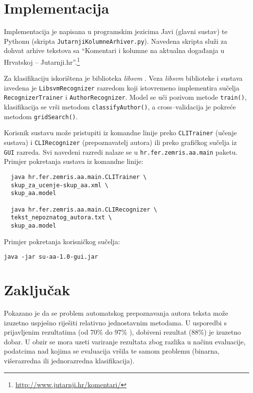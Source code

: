 \documentclass{article}
\begin{document}
\section{Implementacija}
\label{sec:implementacija}
Implementacija je napisana u programskim jezicima Javi (glavni sustav) te
Pythonu (skripta \texttt{JutarnjiKolumneArhiver.py}). Navedena skripta služi za
dohvat arhive tekstova sa ``Komentari i kolumne na aktualna događanja u
Hrvatskoj -- Jutarnji.hr''.\footnote{\url{http://www.jutarnji.hr/komentari/}}


Za klasifikaciju iskorištena je biblioteka \emph{libsvm} \citep{CC01a}. Veza
\emph{libsvm} biblioteke i sustava izvedena je \texttt{LibsvmRecognizer}
razredom koji istovremeno implementira sučelja \texttt{RecognizerTrainer} i
\texttt{AuthorRecognizer}. Model se uči pozivom metode \texttt{train()},
klasifikacija se vrši metodom \texttt{classifyAuthor()}, a cross--validacija je
pokreće metodom \texttt{gridSearch()}.

Korisnik sustavu može pristupiti iz komandne linije preko \texttt{CLITrainer}
(učenje sustava) i \texttt{CLIRecognizer} (prepoznavatelj autora) ili preko
grafičkog sučelja iz \texttt{GUI} razreda. Svi navedeni razredi nalaze se u
\texttt{hr.fer.zemris.aa.main} paketu. Primjer pokretanja sustava iz
komandne linije:
\begin{verbatim}
  java hr.fer.zemris.aa.main.CLITrainer \
  skup_za_ucenje-skup_aa.xml \
  skup_aa.model
  
  java hr.fer.zemris.aa.main.CLIRecognizer \
  tekst_nepoznatog_autora.txt \
  skup_aa.model
\end{verbatim}
Primjer pokretanja korisničkog sučelja:
\begin{verbatim}
java -jar su-aa-1.0-gui.jar
\end{verbatim}

\section{Zaključak}
Pokazano je da se problem automatskog prepoznavanja autora teksta može izuzetno
uspješno riješiti relativno jednostavnim metodama. U usporedbi s prijavljenim
rezultatima (od 70\% do 97\%
\citep{coyotl2006authorship,keselj2003n,luyckx2005shallow,stamatatos2001computer,stamatatos1999automatic}),
dobiveni rezultat (88\%) je izuzetno dobar. U obzir se mora uzeti variranje
rezultata zbog razlika u načinu evaluacije, podatcima nad kojima se evaluacija
vršila te samom problemu (binarna, višerazredna ili jednorazredna
klasifikacija).
\end{document}
